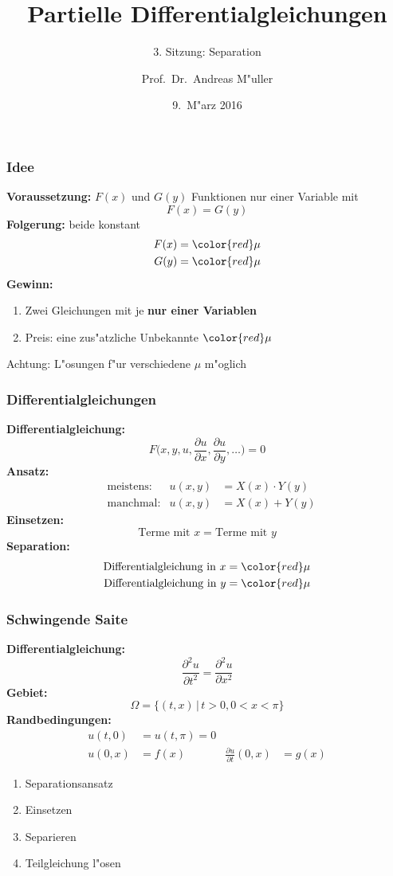 \documentclass{beamer}
\title[]{Partielle Differentialgleichungen}
\subtitle{3. Sitzung: Separation}
\date[9.~M"arz 2016]{9.~M"arz 2016}
\author{Prof.~Dr.~Andreas M"uller}
\begin{document}
\begin{frame}
\titlepage
\end{frame}

\begin{frame}
\frametitle{Idee}
{\bf Voraussetzung:}
$F(x)$ und $G(y)$ Funktionen nur einer Variable mit
\[
F(x)=G(y)
\]
\pause
{\bf Folgerung:} beide konstant
\begin{align*}
F(x)&=\color{red}\mu\\
G(y)&=\color{red}\mu
\end{align*}
\pause
{\bf Gewinn:}
\begin{enumerate}
\item Zwei Gleichungen mit je {\bf nur einer Variablen}
\item Preis: eine zus"atzliche Unbekannte $\color{red}\mu$
\end{enumerate}
\pause
Achtung: L"osungen f"ur verschiedene $\mu$ m"oglich
\end{frame}

\begin{frame}
\frametitle{Differentialgleichungen}
{\bf Differentialgleichung:}
\[
F\biggl(x, y, u,
\frac{\partial u}{\partial x},
\frac{\partial u}{\partial y},\dots\biggr)=0
\]
\pause
{\bf Ansatz:}
\begin{align*}
&\text{meistens:}&
u(x,y)&=X(x)\cdot Y(y)\\
&\text{manchmal:}&
u(x,y)&=X(x) + Y(y)
\end{align*}
\pause
{\bf Einsetzen:}
\[
\text{Terme mit $x$} = \text{Terme mit $y$}
\]
\pause
{\bf Separation:}
\begin{align*}
\text{Differentialgleichung in $x$}&= \color{red}\mu\\
\text{Differentialgleichung in $y$}&= \color{red}\mu
\end{align*}
\end{frame}

\begin{frame}
\frametitle{Schwingende Saite}
{\bf Differentialgleichung:}
\[
\frac{\partial^2 u}{\partial t^2}
=
\frac{\partial^2 u}{\partial x^2}
\]
{\bf Gebiet:}
\[
\Omega = \{ (t,x) \,|\, t>0, 0<x<\pi\}
\]
{\bf Randbedingungen:}
\begin{align*}
u(t,0)&=u(t,\pi)=0\\
u(0,x)&=f(x)&\frac{\partial u}{\partial t}(0,x)&=g(x)
\end{align*}
\begin{enumerate}
\pause
\item Separationsansatz
\item Einsetzen
\item Separieren
\item Teilgleichung l"osen
\end{enumerate}
\end{frame}
\end{document}
